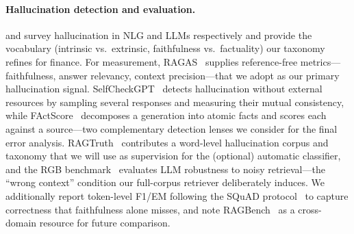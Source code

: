 \documentclass[11pt]{article}
\begin{document}
\paragraph{Hallucination detection and evaluation.}
\citet{ji2023hallucination} and \citet{huang2023hallucinationsurvey} survey
hallucination in NLG and LLMs respectively and provide the vocabulary
(intrinsic vs.\ extrinsic, faithfulness vs.\ factuality) our taxonomy refines
for finance. For measurement, RAGAS~\citep{es2024ragas} supplies reference-free
metrics---faithfulness, answer relevancy, context precision---that we adopt as
our primary hallucination signal. SelfCheckGPT~\citep{manakul2023selfcheckgpt} detects hallucination without
external resources by sampling several responses and measuring their mutual
consistency, while FActScore~\citep{min2023factscore} decomposes a generation
into atomic facts and scores each against a source---two complementary detection
lenses we consider for the final error analysis.
RAGTruth~\citep{niu2024ragtruth} contributes a word-level hallucination corpus
and taxonomy that we will use as supervision for the (optional) automatic
classifier, and the RGB benchmark~\citep{chen2024rgb} evaluates LLM robustness
to noisy retrieval---the ``wrong context'' condition our full-corpus retriever
deliberately induces. We additionally report token-level F1/EM following the
SQuAD protocol~\citep{rajpurkar2016squad} to capture correctness that
faithfulness alone misses, and note RAGBench~\citep{friel2024ragbench} as a
cross-domain resource for future comparison.
\end{document}
